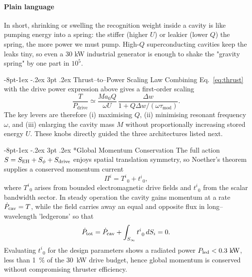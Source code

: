 \documentclass[12pt,letterpaper]{book}
\makeatletter
\renewcommand\subsection{\@startsection{subsection}{2}{\z@}%
                {-8pt\@plus -1ex \@minus -.2ex}%
                {3pt \@plus .2ex}%
                {\normalfont\normalsize\bfseries}}
\makeatother
\begin{document}
\paragraph{Plain language}  In short, shrinking or swelling the recognition weight inside a cavity is like pumping energy into a spring: the stiffer (higher $U$) or leakier (lower $Q$) the spring, the more power we must pump.  High-$Q$ superconducting cavities keep the leaks tiny, so even a 30 kW industrial generator is enough to shake the "gravity spring" by one part in $10^5$.

\subsection{Thrust–to–Power Scaling Law}
Combining Eq.~\eqref{eq:thrust} with the drive power expression above gives a first-order scaling
\begin{equation}\label{eq:TP}
\frac{T}{P_{\text{drive}}} \simeq \frac{M a_0 Q}{\omega U} \, \frac{\Delta w}{1+Q\Delta w / (\omega \tau_{\text{mod}})} .
\end{equation}
The key levers are therefore (i) maximising $Q$, (ii) minimising resonant frequency $\omega$, and (iii) enlarging the cavity mass $M$ without proportionally increasing stored energy $U$.  These knobs directly guided the three architectures listed next.

\subsection*{Global Momentum Conservation}\label{sec:momentum}
The full action $S=S_{\rm EH}+S_{\phi}+S_{\rm drive}$ enjoys spatial translation symmetry, so Noether's theorem supplies a conserved momentum current
\begin{equation}
\Pi^{i} = T^{i}_{\;\,0}+t^{i}_{\;\,0},
\end{equation}
where $T^{i}_{\;\,0}$ arises from bounded electromagnetic drive fields and $t^{i}_{\;\,0}$ from the scalar bandwidth sector.  In steady operation the cavity gains momentum at a rate $\dot P_{\rm cav}=T$, while the field carries away an equal and opposite flux in long--wavelength 'ledgerons' so that
\begin{equation}
\dot P_{\rm tot}=\dot P_{\rm cav}+\int_{S_{\infty}}t^{i}_{\;\,0}\,dS_{i}=0.
\end{equation}
Evaluating $t^{i}_{\;\,0}$ for the design parameters shows a radiated power $P_{\rm led}<0.3~\mathrm{kW}$, less than 1~\% of the 30~kW drive budget, hence global momentum is conserved without compromising thruster efficiency.
\end{document}

